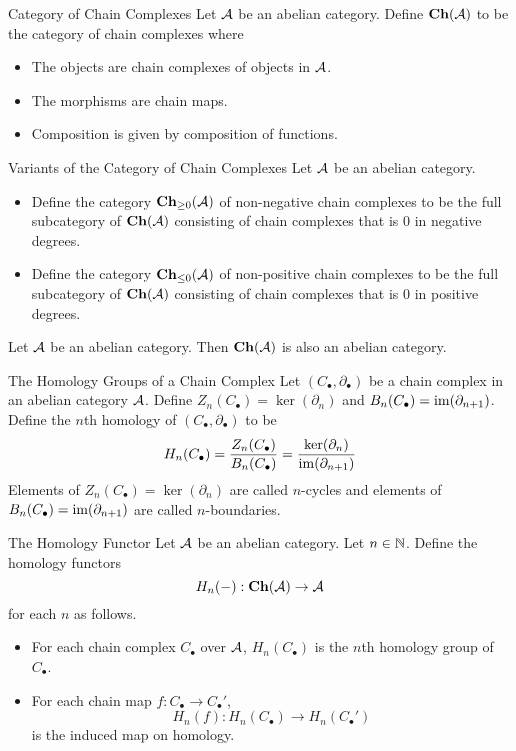 \documentclass[a4paper]{article}
\begin{document}
\begin{defn}{Category of Chain Complexes}{} Let $\mathcal{A}$ be an abelian category. Define $\bold{Ch}(\mathcal{A})$ to be the category of chain complexes where 
\begin{itemize}
\item The objects are chain complexes of objects in $\mathcal{A}$. 
\item The morphisms are chain maps. 
\item Composition is given by composition of functions. 
\end{itemize}
\end{defn}

\begin{defn}{Variants of the Category of Chain Complexes}{} Let $\mathcal{A}$ be an abelian category. 
\begin{itemize}
\item Define the category $\bold{Ch}_{\geq 0}(\mathcal{A})$ of non-negative chain complexes to be the full subcategory of $\bold{Ch}(\mathcal{A})$ consisting of chain complexes that is $0$ in negative degrees. 
\item Define the category $\bold{Ch}_{\leq 0}(\mathcal{A})$ of non-positive chain complexes to be the full subcategory of $\bold{Ch}(\mathcal{A})$ consisting of chain complexes that is $0$ in positive degrees. 
\end{itemize}
\end{defn}

\begin{thm}{}{} Let $\mathcal{A}$ be an abelian category. Then $\bold{Ch}(\mathcal{A})$ is also an abelian category. 
\end{thm}

\begin{defn}{The Homology Groups of a Chain Complex}{} Let $(C_\bullet,\partial_\bullet)$ be a chain complex in an abelian category $\mathcal{A}$. Define $Z_n(C_\bullet)=\ker(\partial_n)$ and $B_n(C_\bullet)=\operatorname{im}(\partial_{n+1})$. Define the $n$th homology of $(C_\bullet,\partial_\bullet)$ to be $$H_n(C_\bullet)=\frac{Z_n(C_\bullet)}{B_n(C_\bullet)}=\frac{\ker(\partial_n)}{\operatorname{im}(\partial_{n+1})}$$
Elements of $Z_n(C_\bullet)=\ker(\partial_n)$ are called $n$-cycles and elements of $B_n(C_\bullet)=\operatorname{im}(\partial_{n+1})$ are called $n$-boundaries. 
\end{defn}

\begin{defn}{The Homology Functor}{} Let $\mathcal{A}$ be an abelian category. Let $n\in\mathbb{N}$. Define the homology functors $$H_n(-):\bold{Ch}(\mathcal{A})\to\mathcal{A}$$ for each $n$ as follows. 
\begin{itemize}
\item For each chain complex $C_\bullet$ over $\mathcal{A}$, $H_n(C_\bullet)$ is the $n$th homology group of $C_\bullet$. 
\item For each chain map $f:C_\bullet\to C_\bullet'$, $$H_n(f):H_n(C_\bullet)\to H_n(C_\bullet')$$ is the induced map on homology. 
\end{itemize}
\end{defn}
\end{document}

